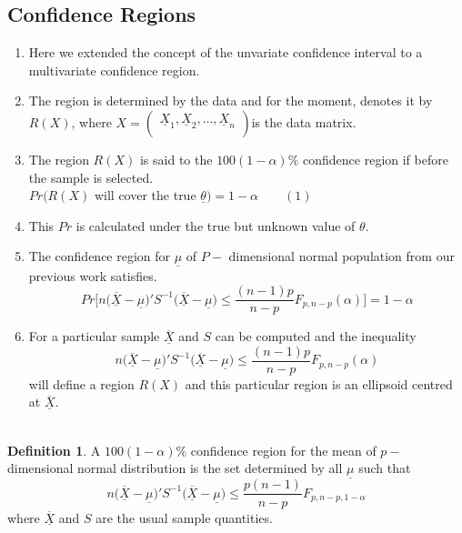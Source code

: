 \documentclass[11pt,a4paper]{article}
\theoremstyle{definition}
\newtheorem{defn}[thm]{Definition}
\begin{document}
\pagebreak
\subsection{Confidence Regions}
\begin{enumerate}
\item Here we extended the concept of the unvariate confidence interval to a multivariate confidence region.
\item The region is determined by the data and for the moment, denotes it by $R(X)$, where $X=
\begin{pmatrix}
\underline{X}_1,\underline{X}_2,\ldots,\underline{X}_n\\
\end{pmatrix}$is the data matrix.
\item The region $R(X)$ is said to the $100(1-\alpha)\%$ confidence region if before the sample is selected.\\

$Pr( R(X)$ will cover the true $\underline{\theta})=1-\alpha \qquad (1)$
\item This $Pr$ is calculated under  the true but unknown value of $\theta$.
\item The confidence region for $\underline{\mu}$ of $P-$ dimensional normal population from our previous work satisfies.
\begin{equation}\tag{2}
Pr\Bigg[n\big(\overline{\underline{X}}-\underline{\mu}\big)'S^{-1}\big(\overline{\underline{X}}-\underline{\mu}\big)\leq \frac{(n-1)p}{n-p}F_{p,n-p}(\alpha)\Bigg] = 1 - \alpha
\end{equation}
\item For a particular sample $\overline{\underline{X}}$ and $S$ can be computed and the inequality 
$$ n\big(\overline{\underline{X}}-\underline{\mu}\big)'S^{-1}\big(\overline{\underline{X}}-\underline{\mu}\big)\leq \frac{(n-1)p}{n-p}F_{p,n-p}(\alpha)$$ 
will define a region $R(X)$ and this particular region is an ellipsoid centred at $\overline{\underline{X}}$.\\\\
\end{enumerate}








\begin{defn}
A $100(1-\alpha)\%$ confidence region for the mean of $p-$ dimensional normal distribution is the set determined by all $\underline{\mu}$ such that $$n\big(\overline{\underline{X}}-\underline{\mu}\big)'S^{-1}\big(\overline{\underline{X}}-\underline{\mu}\big)\leq \frac{p(n-1)}{n-p}F_{p,n-p,1-\alpha}$$
where $\overline{\underline{X}}$ and $S$ are the usual sample quantities.\\
\end{defn}
\end{document}

